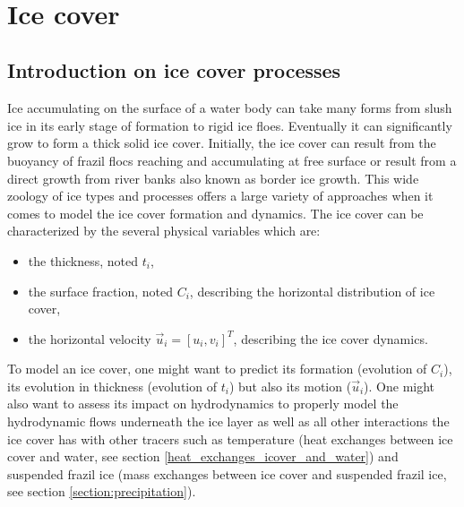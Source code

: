  \renewcommand{\labelitemi}{$\rhd$}


~\newline
\chapter{Ice cover}
\label{chapter:ice_cover}

\section{Introduction on ice cover processes}


Ice accumulating on the surface of a water body can take many forms from slush ice in its early 
stage of formation to rigid ice floes.
Eventually it can significantly grow to form a thick solid ice cover.
Initially, the ice cover can result from the buoyancy of frazil flocs reaching 
and accumulating at free surface or
result from a direct growth from river banks also known as border ice growth.
This wide zoology of ice types and processes offers a large variety of approaches 
when it comes to model the ice cover formation and dynamics.
The ice cover can be characterized by the several physical variables which are:
\begin{itemize}
    \item the thickness, noted $t_i$,
    \item the surface fraction, noted $C_i$, describing the horizontal distribution of ice cover,
    \item the horizontal velocity $\vec{u}_i = [u_i,v_i]^T$, describing the ice cover dynamics.
\end{itemize}

To model an ice cover, one might want to predict its formation (evolution of $C_i$), 
its evolution in thickness (evolution of $t_i$) but also its motion ($\vec{u}_i$).
One might also want to assess its impact on hydrodynamics to properly model the hydrodynamic flows 
underneath the ice layer as well as all other interactions the ice cover has with other tracers such as temperature (heat exchanges between ice cover and water, see section \ref{heat_exchanges_icover_and_water}) 
and suspended frazil ice (mass exchanges between ice cover and suspended frazil ice,
 see section \ref{section:precipitation}).

